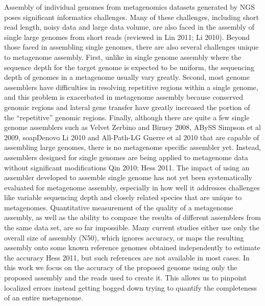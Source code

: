 \documentclass[phd,tocprelim]{cornell}
\begin{document}
Assembly of individual genomes from metagenomics datasets generated by NGS poses significant informatics challenges. Many of these challenges, including short read length, noisy data and large data volume, are also faced in the assembly of single large genomes from short reads (reviewed in {Lin 2011; Li 2010}). Beyond those faced in assembling single genomes, there are also several challenges unique to metagenome assembly. First, unlike in single genome assembly where the sequence depth for the target genome is expected to be uniform, the sequencing depth of genomes in a metagenome usually vary greatly. Second, most genome assemblers have difficulties in resolving repetitive regions within a single genome, and this problem is exacerbated in metagenome assembly because conserved genomic regions and lateral gene transfer have greatly increased the portion of the “repetitive” genomic regions. Finally, although there are quite a few single genome assemblers such as Velvet {Zerbino and Birney 2008}, ABySS {Simpson et al 2009}, soapDenovo {Li 2010} and All-Path-LG {Gnerre et al 2010} that are capable of assembling large genomes, there is no metagenome specific assembler yet. Instead, assemblers designed for single genomes are being applied to metagenome data without significant modifications {Qin 2010; Hess 2011}. The impact of using an assembler developed to assemble single genome has not yet been systematically evaluated for metagenome assembly, especially in how well it addresses challenges like variable sequencing depth and closely related species that are unique to metagenomes. Quantitative measurement of the quality of a metagenome assembly, as well as the ability to compare the results of different assemblers from the same data set, are so far impossible. Many current studies either use only the overall size of assembly (N50), which ignores accuracy, or maps the resulting assembly onto some known reference genomes obtained independently to estimate the accuracy {Hess 2011}, but such references are not available in most cases. In this work we focus on the accuracy of the proposed genome using only the proposed assembly and the reads used to create it. This allows us to pinpoint localized errors instead getting bogged down trying to quantify the completeness of an entire metagenome.
\end{document}
